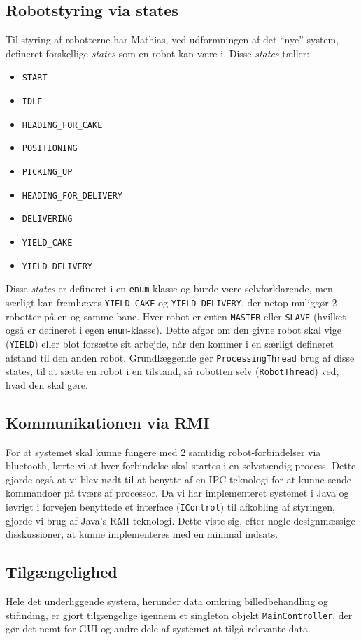 \subsection{Robotstyring via states}
Til styring af robotterne har Mathias, ved udformningen af det "`nye"' system, defineret forskellige \textit{states} som en robot kan være i. Disse \textit{states} tæller:
\begin{itemize}
\item \texttt{START}
\item \texttt{IDLE}
\item \texttt{HEADING\_FOR\_CAKE}
\item \texttt{POSITIONING}
\item \texttt{PICKING\_UP}
\item \texttt{HEADING\_FOR\_DELIVERY}
\item \texttt{DELIVERING}
\item \texttt{YIELD\_CAKE}
\item \texttt{YIELD\_DELIVERY}
\end{itemize}
Disse \textit{states} er defineret i en \texttt{enum}-klasse og burde være selvforklarende, men særligt kan fremhæves \texttt{YIELD\_CAKE} og \texttt{YIELD\_DELIVERY}, der netop muliggør 2 robotter på en og samme bane. Hver robot er enten \texttt{MASTER} eller \texttt{SLAVE} (hvilket også er defineret i egen \texttt{enum}-klasse). Dette afgør om den givne robot skal vige (\texttt{YIELD}) eller blot forsætte sit arbejde, når den kommer i en særligt defineret afstand til den anden robot. Grundlæggende gør \texttt{ProcessingThread} brug af disse states, til at sætte en robot i en tilstand, så robotten selv (\texttt{RobotThread}) ved, hvad den skal gøre.

\subsection{Kommunikationen via RMI}
For at systemet skal kunne fungere med 2 samtidig robot-forbindelser via bluetooth, lærte vi at hver forbindelse skal startes i en selvstændig process. Dette gjorde også at vi blev nødt til at benytte af en IPC teknologi for at kunne sende kommandoer på tværs af processor.
Da vi har implementeret systemet i Java og iøvrigt i forvejen benyttede et interface (\texttt{IControl}) til afkobling af styringen, gjorde vi brug af Java’s RMI teknologi. Dette viste sig, efter nogle designmæssige disskussioner, at kunne implementeres med en minimal indsats.

\subsection{Tilgængelighed}
Hele det underliggende system, herunder data omkring billedbehandling og stifinding, er gjort tilgængelige igennem et singleton objekt \texttt{MainController}, der gør det nemt for GUI og andre dele af systemet at tilgå relevante data.

